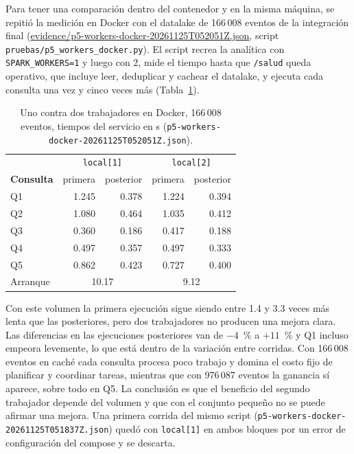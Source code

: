 \documentclass[conference]{IEEEtran}
\begin{document}
Para tener una comparación dentro del contenedor y en la misma máquina, se repitió la medición en Docker con el datalake de 166\,008 eventos de la integración final (\url{evidence/p5-workers-docker-20261125T052051Z.json}, script \texttt{pruebas/p5\_workers\_docker.py}). El script recrea la analítica con \texttt{SPARK\_WORKERS=1} y luego con 2, mide el tiempo hasta que \texttt{/salud} queda operativo, que incluye leer, deduplicar y cachear el datalake, y ejecuta cada consulta una vez y cinco veces más (Tabla~\ref{tab:docker}).

\begin{table}[!t]
\caption{Uno contra dos trabajadores en Docker, 166\,008 eventos, tiempos del servicio en s (\texttt{p5-workers-docker-20261125T052051Z.json}).}
\label{tab:docker}
\centering\footnotesize
\begin{tabular}{@{}l r r r r@{}}
\toprule
& \multicolumn{2}{c}{\texttt{local[1]}} & \multicolumn{2}{c}{\texttt{local[2]}} \\
\textbf{Consulta} & primera & posterior & primera & posterior \\
\midrule
Q1 & 1.245 & 0.378 & 1.224 & 0.394 \\
Q2 & 1.080 & 0.464 & 1.035 & 0.412 \\
Q3 & 0.360 & 0.186 & 0.417 & 0.188 \\
Q4 & 0.497 & 0.357 & 0.497 & 0.333 \\
Q5 & 0.862 & 0.423 & 0.727 & 0.400 \\
Arranque & \multicolumn{2}{c}{10.17} & \multicolumn{2}{c}{9.12} \\
\bottomrule
\end{tabular}
\end{table}

Con este volumen la primera ejecución sigue siendo entre 1.4 y 3.3 veces más lenta que las posteriores, pero dos trabajadores no producen una mejora clara. Las diferencias en las ejecuciones posteriores van de $-4$~\% a $+11$~\% y Q1 incluso empeora levemente, lo que está dentro de la variación entre corridas. Con 166\,008 eventos en caché cada consulta procesa poco trabajo y domina el costo fijo de planificar y coordinar tareas, mientras que con 976\,087 eventos la ganancia sí aparece, sobre todo en Q5. La conclusión es que el beneficio del segundo trabajador depende del volumen y que con el conjunto pequeño no se puede afirmar una mejora. Una primera corrida del mismo script (\texttt{p5-workers-docker-20261125T051837Z.json}) quedó con \texttt{local[1]} en ambos bloques por un error de configuración del compose y se descarta.
\end{document}
